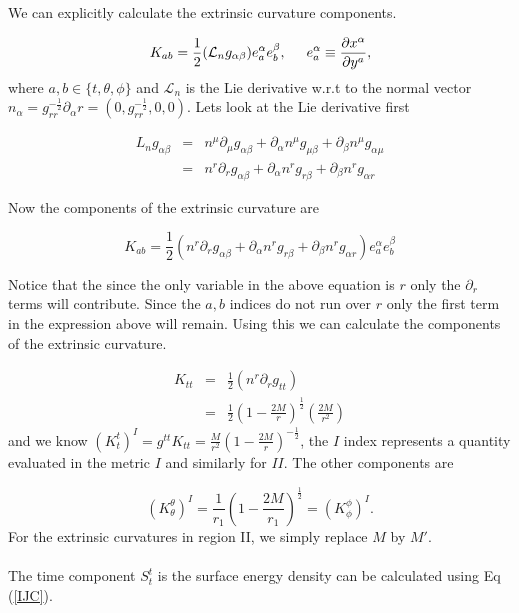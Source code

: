 \documentclass[aps,showpacs,onecolumn,floats,prd,superscriptaddress,nofootinbib]{revtex4-1}
\begin{document}
We can explicitly calculate the extrinsic curvature components.

\begin{equation}
	K_{ab} = \frac{1}{2} (\mathcal{L}_n g_{\alpha \beta}) e^\alpha_a e^\beta_b, \hspace{5mm} e^\alpha_a \equiv \frac{\partial x^\alpha}{\partial y^a},
\end{equation}
where $a,b \in \{t,\theta, \phi \}$ and $\mathcal{L}_n$ is the Lie derivative w.r.t to the normal vector $n_\alpha = g_{rr}^{-\frac{1}{2}} \partial_\alpha r = (0, g_{rr}^{-\frac{1}{2}}, 0 , 0)$. Lets look at the Lie derivative first

\begin{eqnarray}
	L_n g_{\alpha \beta} & = & n^\mu \partial_\mu g_{\alpha \beta} + \partial_\alpha n^\mu g_{\mu \beta} + \partial_\beta n^\mu g_{\alpha \mu}	\nonumber	\\
	& = & n^r \partial_r g_{\alpha \beta} + \partial_\alpha n^r g_{r \beta} + \partial_\beta n^r g_{\alpha r}	
\end{eqnarray}

Now the components of the extrinsic curvature are

\begin{equation}
	K_{ab} = \frac{1}{2} (n^r \partial_r g_{\alpha \beta} + \partial_\alpha n^r g_{r \beta} + \partial_\beta n^r g_{\alpha r}) e^\alpha_a e^\beta_b	\label{Ecuv}
\end{equation}

Notice that the since the only variable in the above equation is $r$ only the $\partial_r$ terms will contribute. Since the $a,b$ indices do not run over $r$ only the first term in the expression above will remain. Using this we can calculate the components of the extrinsic curvature. 

\begin{eqnarray}
	K_{tt} & = & \frac{1}{2} (n^r \partial_r g_{tt}) 	\nonumber	\\
	& = & \frac{1}{2} \left( 1 - \frac{2M}{r} \right)^\frac{1}{2}  \left( \frac{2M}{r^2} \right)
\end{eqnarray}
and we know $(K^t_t)^{I} = g^{tt}K_{tt} = \frac{M}{r^2} \left( 1 - \frac{2M}{r} \right)^{-\frac{1}{2}}$, the $I$ index represents a quantity evaluated in the metric $I$ and similarly for $II$. The other components are 

\begin{equation}
	(K^\theta_\theta)^{I} = \frac{1}{r_1} \left( 1 - \frac{2M}{r_1} \right)^\frac{1}{2} = (K^\phi_\phi)^{I}.
\end{equation}
For the extrinsic curvatures in region II, we simply replace $M$ by $M'$.
\\
\\
The time component $S^t_t$ is the surface energy density can be calculated using Eq (\ref{IJC}).
\end{document}
